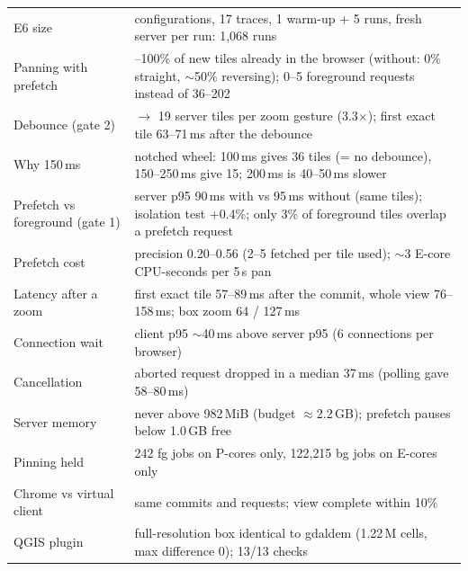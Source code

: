 ﻿\documentclass[11pt,a4paper]{article}
\begin{document}
\begin{longtable}{>{\raggedright\arraybackslash}p{5.3cm}>{\raggedright\arraybackslash}p{10.1cm}}
E6 size & 24 configurations, 17 traces, 1 warm-up + 5 runs, fresh server per run: 1{,}068 runs \\
Panning with prefetch & 98--100\% of new tiles already in the browser (without: 0\% straight, $\sim$50\% reversing);
0--5 foreground requests instead of 36--202 \\
Debounce (gate 2) & 62 $\to$ 19 server tiles per zoom gesture (3.3$\times$); first exact tile 63--71\,ms after the debounce \\
Why 150\,ms & notched wheel: 100\,ms gives 36 tiles (= no debounce), 150--250\,ms give 15; 200\,ms is 40--50\,ms slower \\
Prefetch vs foreground (gate 1) & server p95 90\,ms with vs 95\,ms without (same tiles); isolation test +0.4\%; only 3\% of
foreground tiles overlap a prefetch request \\
Prefetch cost & precision 0.20--0.56 (2--5 fetched per tile used); $\sim$3 E-core CPU-seconds per 5\,s pan \\
Latency after a zoom & first exact tile 57--89\,ms after the commit, whole view 76--158\,ms; box zoom 64 / 127\,ms \\
Connection wait & client p95 $\sim$40\,ms above server p95 (6 connections per browser) \\
Cancellation & aborted request dropped in a median 37\,ms (polling gave 58--80\,ms) \\
Server memory & never above 982\,MiB (budget $\approx$2.2\,GB); prefetch pauses below 1.0\,GB free \\
Pinning held & 20{,}242 fg jobs on P-cores only, 122{,}215 bg jobs on E-cores only \\
Chrome vs virtual client & same commits and requests; view complete within 10\% \\
QGIS plugin & full-resolution box identical to gdaldem (1.22\,M cells, max difference 0); 13/13 checks \\
\bottomrule
\end{longtable}
\end{document}
